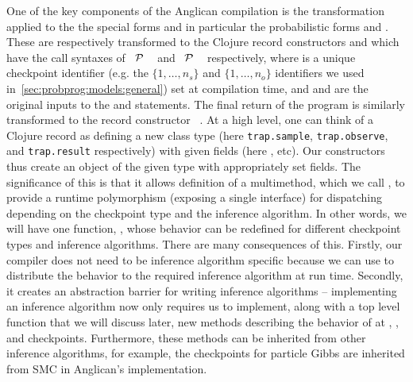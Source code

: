 One of the key components of the Anglican compilation is the transformation applied to the
the special forms and in particular the probabilistic forms \sample and \observe.  These
are respectively transformed to the Clojure record constructors \samplecps and \observecps 
which have the call syntaxes of
 ~$\mathcal{P}$ ~\angstate\clj{)} and  ~$\mathcal{P}$ ~\angstate\clj{)}
respectively,
where  is a unique checkpoint identifier (e.g. the $\{1,\dots,n_s\}$ and $\{1,\dots,n_o\}$ identifiers
we used in~\ref{sec:probprog:models:general}) set at compilation time, and   and 
are the original inputs to the \sample and \observe statements.  
The final return of the program is similarly transformed to the record constructor
~\angstate\clj{)}.
At a high level, one can
think of a Clojure record as defining a new class type (here {\small \texttt{trap.sample}}, {\small \texttt{trap.observe}},
and {\small \texttt{trap.result}} respectively) with given fields (here ,  etc).  Our constructors thus create
an object of the given type with appropriately set fields.  The significance of this is that
it allows definition of a multimethod, which we call \checkpoint, to provide a runtime polymorphism
(exposing a single interface) for dispatching depending on the checkpoint
type and the inference algorithm.  In other words, we will have one function, \checkpoint, whose
behavior can be redefined for different checkpoint types and inference algorithms.  There are many
consequences of this.  Firstly, our compiler does not need to be inference algorithm specific
because we can use \checkpoint to distribute the behavior to the required inference algorithm
at run time.  Secondly, it creates an abstraction barrier for writing inference algorithms -- implementing
an inference algorithm now only requires us to implement, along with a top level function \anginfer that
we will discuss later, new methods describing the behavior of \checkpoint at \sample, \observe, and 
checkpoints.  Furthermore, these methods can be inherited from other inference algorithms, for example,
the \observe checkpoints for particle Gibbs are inherited from SMC in Anglican's implementation.

